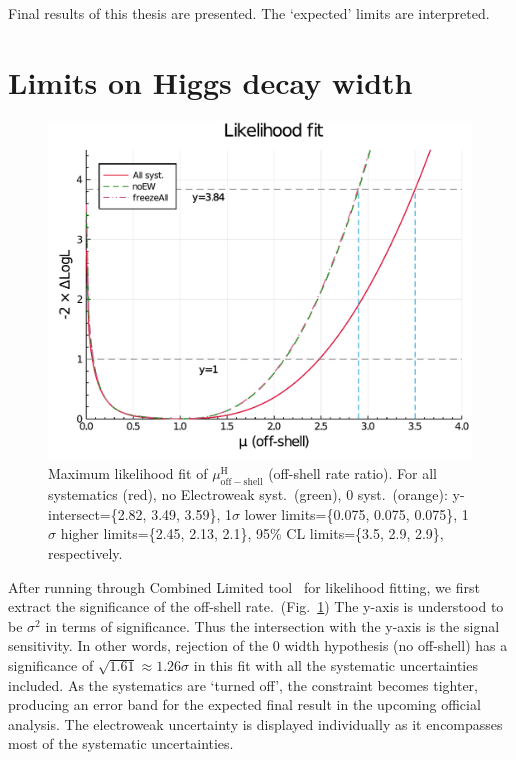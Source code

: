Final results of this thesis are presented. The 
`expected' limits are interpreted.
\pagebreak
\section{Limits on Higgs decay width}
\begin{figure}[htb]
    \centering
    \includegraphics[width=.8\linewidth]{fig/Final_fit_mu_offshell.pdf}
    \caption{Maximum likelihood fit of $\mu^\mathrm{H}_\mathrm{off-shell}$ (off-shell rate ratio).
    For all systematics (red), no Electroweak syst.~(green),
    0 syst.~(orange): y-intersect=\{2.82, 3.49, 3.59\}, 1$\sigma$ lower limits=\{0.075, 0.075, 0.075\},
1$\sigma$ higher limits=\{2.45, 2.13, 2.1\}, 95\% CL limits=\{3.5, 2.9, 2.9\}, respectively.}
    \label{fig:final_fit_mu}
\end{figure}
After running through Combined Limited tool~\cite{combine1, combine2, combine3} for likelihood fitting, we first extract the significance
of the off-shell rate.~(Fig.~\ref{fig:final_fit_mu})
The y-axis is understood to be $\sigma^2$ in terms of significance. Thus
the intersection with the y-axis is the signal sensitivity. In other words,
rejection of the 0 width hypothesis (no off-shell) has a significance of 
$\sqrt{1.61} \approx 1.26\sigma$ in this fit with all the systematic uncertainties included.
As the systematics are `turned off', the constraint becomes tighter, producing an error band for the expected
final result in the upcoming official analysis. The electroweak uncertainty is displayed individually as
it encompasses most of the systematic uncertainties.

